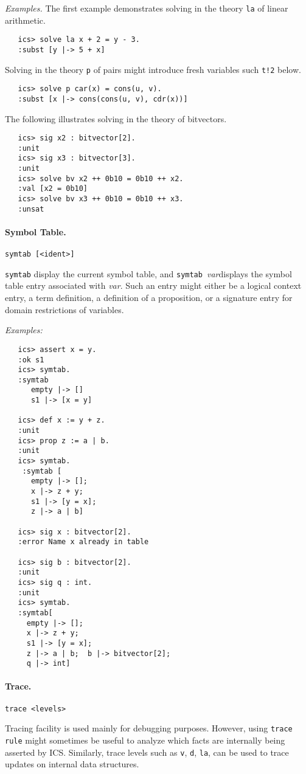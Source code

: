 \documentclass[12pt]{article}
\newcommand{\var}{\textit{var}}
\begin{document}
{\em Examples.} The first example demonstrates solving in the theory \texttt{la} of
linear arithmetic.
   \begin{verbatim}
   ics> solve la x + 2 = y - 3.
   :subst [y |-> 5 + x]
   \end{verbatim}
Solving in the theory \texttt{p} of pairs might introduce fresh variables such \texttt{t!2}
below.
   \begin{verbatim}
   ics> solve p car(x) = cons(u, v).
   :subst [x |-> cons(cons(u, v), cdr(x))]
   \end{verbatim}
The following illustrates solving in the theory of bitvectors.
   \begin{verbatim}
   ics> sig x2 : bitvector[2].
   :unit
   ics> sig x3 : bitvector[3].
   :unit
   ics> solve bv x2 ++ 0b10 = 0b10 ++ x2.
   :val [x2 = 0b10]
   ics> solve bv x3 ++ 0b10 = 0b10 ++ x3.
   :unsat
   \end{verbatim}

\paragraph{Symbol Table.}\label{cmd:symtab}
  \begin{center}
  \texttt{symtab [<ident>]}
  \end{center}
\texttt{symtab} display the current symbol table, and
\texttt{symtab}\ \var displays the symbol table entry
associated with \var.  Such an entry might either be a logical
context entry, a term definition, a definition of a proposition,
or a signature entry for domain restrictions of variables.

\noindent
{\em Examples:}
   \begin{verbatim}
   ics> assert x = y.
   :ok s1
   ics> symtab.
   :symtab
      empty |-> []
      s1 |-> [x = y]

   ics> def x := y + z.
   :unit
   ics> prop z := a | b.
   :unit
   ics> symtab.
    :symtab [
      empty |-> []; 
      x |-> z + y; 
      s1 |-> [y = x]; 
      z |-> a | b]
  
   ics> sig x : bitvector[2].
   :error Name x already in table

   ics> sig b : bitvector[2].
   :unit
   ics> sig q : int.
   :unit
   ics> symtab.
   :symtab[
     empty |-> []; 
     x |-> z + y; 
     s1 |-> [y = x]; 
     z |-> a | b;  b |-> bitvector[2]; 
     q |-> int]
   \end{verbatim}


\paragraph{Trace.}\label{cmd:trace}
  \begin{center}
  \texttt{trace <levels>} 
  \end{center}
Tracing facility is used mainly for debugging purposes.
However, using \texttt{trace rule} might sometimes be
useful to analyze which facts are internally being asserted 
by ICS. Similarly, trace levels such as \texttt{v}, \texttt{d},
\texttt{la}, can be used to trace updates on internal data 
structures.
\end{document}
